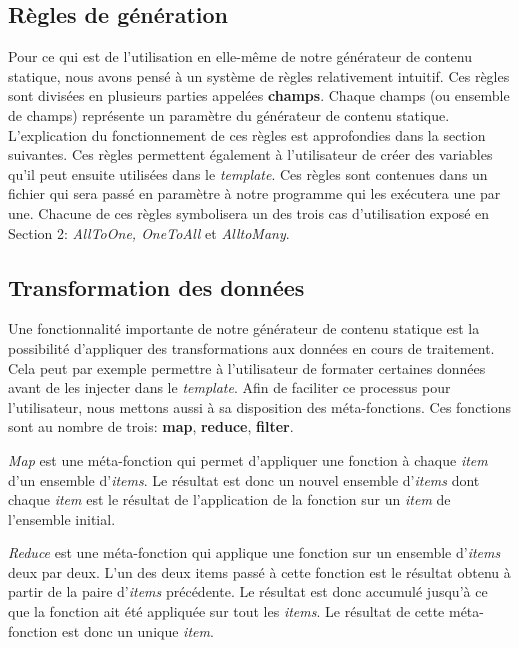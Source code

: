 	\subsection{Règles de génération}
		Pour ce qui est de l'utilisation en elle-même de notre générateur de contenu statique, nous avons pensé à un système de règles relativement intuitif.
		Ces règles sont divisées en plusieurs parties appelées \textbf{champs}. Chaque champs (ou ensemble de champs) représente un paramètre du générateur de contenu statique.	L'explication du fonctionnement de ces règles est approfondies dans la section suivantes. Ces règles permettent également à l'utilisateur de créer des variables qu'il peut ensuite utilisées dans le \textit{template}. Ces règles sont contenues dans un fichier qui sera passé en paramètre à notre programme qui les exécutera une par une. Chacune de ces règles symbolisera un des trois cas d'utilisation exposé en Section 2: \textit{AllToOne, OneToAll} et \textit{AlltoMany}.
		
	\subsection{Transformation des données}
	
		Une fonctionnalité importante de notre générateur de contenu statique est la possibilité d'appliquer des transformations aux données en cours de traitement. Cela peut par exemple permettre à l'utilisateur de formater certaines données avant de les injecter dans le \textit{template}. Afin de faciliter ce processus pour l'utilisateur, nous mettons aussi à sa disposition des méta-fonctions. Ces fonctions sont au nombre de trois: \textbf{map}, \textbf{reduce}, \textbf{filter}. 
		
		\textit{Map} est une méta-fonction qui permet d'appliquer une fonction à chaque \textit{item} d'un ensemble d'\textit{items}. Le résultat est donc un nouvel ensemble d'\textit{items} dont chaque  \textit{item} est le résultat de l'application de la fonction sur un \textit{item} de l'ensemble initial.
		
		\textit{Reduce} est une méta-fonction qui applique une fonction sur un ensemble d'\textit{items} deux par deux. L'un des deux items passé à cette fonction est le résultat obtenu à partir de la paire d'\textit{items} précédente. Le résultat est donc accumulé jusqu'à ce que la fonction ait été appliquée sur tout les \textit{items}. Le résultat de cette méta-fonction est donc un unique \textit{item}.
		
